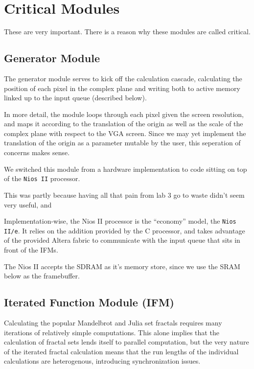 \documentclass{article}
\begin{document}
\section{Critical Modules}

These are very important. There is a reason why these modules are
called critical.

\subsection{Generator Module}

The generator module serves to kick off the calculation cascade,
calculating the position of each pixel in the complex plane and
writing both to active memory linked up to the input queue (described
below).

In more detail, the module loops through each pixel given the screen
resolution, and maps it according to the translation of the origin as
well as the scale of the complex plane with respect to the VGA
screen. Since we may yet implement the translation of the origin as a
parameter mutable by the user, this seperation of concerns makes
sense.

We switched this module from a hardware implementation to code sitting
on top of the \verb!Nios II! processor.

This was partly because having all that pain from lab 3 go to waste
didn't seem very useful, and 

Implementation-wise, the Nios II processor is the ``economy'' model,
the \verb!Nios II/e!. It relies on the addition provided by the C
processor, and takes advantage of the provided Altera fabric to
communicate with the input queue that sits in front of the IFMs.

The Nios II accepts the SDRAM as it's memory store, since we use the
SRAM below as the framebuffer.

\subsection{Iterated Function Module (IFM)}

Calculating the popular Mandelbrot and Julia set fractals requires
many iterations of relatively simple computations. This alone implies
that the calculation of fractal sets lends itself to parallel
computation, but the very nature of the iterated fractal calculation
means that the run lengths of the individual calculations are
heterogenous, introducing synchronization issues.
\end{document}
